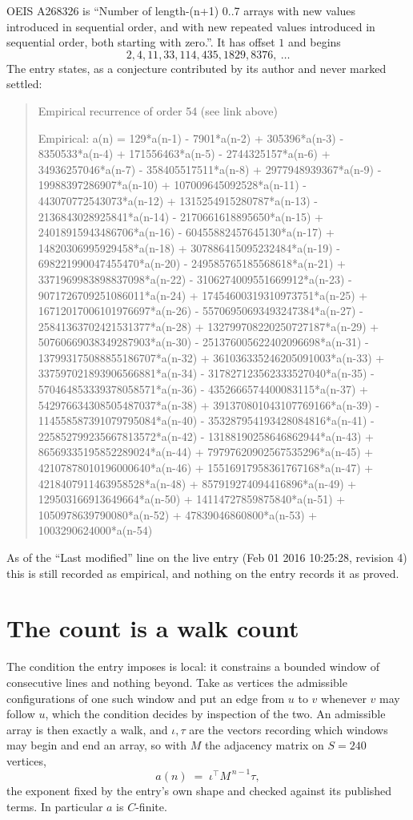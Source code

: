 \documentclass[11pt,a4paper]{article}
\theoremstyle{plain}
\theoremstyle{definition}
\begin{document}
OEIS A268326 is ``Number of length-(n+1) 0..7 arrays with new values introduced in sequential order, and with new repeated values introduced in sequential order, both starting with zero.''. It has offset $1$ and begins
\[
2, 4, 11, 33, 114, 435, 1829, 8376,\ \dots
\]
The entry states, as a conjecture contributed by its author and never marked settled:
\begin{quote}\raggedright\small
Empirical recurrence of order 54 (see link above)

Empirical: a(n) = 129*a(n-1) - 7901*a(n-2) + 305396*a(n-3) - 8350533*a(n-4) + 171556463*a(n-5) - 2744325157*a(n-6) + 34936257046*a(n-7) - 358405517511*a(n-8) + 2977948939367*a(n-9) - 19988397286907*a(n-10) + 107009645092528*a(n-11) - 443070772543073*a(n-12) + 1315254915280787*a(n-13) - 2136843028925841*a(n-14) - 2170661618895650*a(n-15) + 24018915943486706*a(n-16) - 60455882457645130*a(n-17) + 14820306995929458*a(n-18) + 307886415095232484*a(n-19) - 698221990047455470*a(n-20) - 249585765185568618*a(n-21) + 3371969983898837098*a(n-22) - 3106274009551669912*a(n-23) - 9071726709251086011*a(n-24) + 17454600319310973751*a(n-25) + 16712017006101976697*a(n-26) - 55706950693493247384*a(n-27) - 25841363702421531377*a(n-28) + 132799708220250727187*a(n-29) + 50760669038349287903*a(n-30) - 251376005622402096698*a(n-31) - 137993175088855186707*a(n-32) + 361036335246205091003*a(n-33) + 337597021893906566881*a(n-34) - 317827123562333527040*a(n-35) - 570464853339378058571*a(n-36) - 4352666574400083115*a(n-37) + 542976634308505487037*a(n-38) + 391370801043107769166*a(n-39) - 114558587391079795084*a(n-40) - 353287954193428084816*a(n-41) - 225852799235667813572*a(n-42) - 13188190258646862944*a(n-43) + 86569335195852289024*a(n-44) + 79797620902567535296*a(n-45) + 42107878010196000640*a(n-46) + 15516917958361767168*a(n-47) + 4218407911463958528*a(n-48) + 857919274094416896*a(n-49) + 129503166913649664*a(n-50) + 14114727859875840*a(n-51) + 1050978639790080*a(n-52) + 47839046860800*a(n-53) + 1003290624000*a(n-54)
\end{quote}
As of the ``Last modified'' line on the live entry (Feb 01 2016 10:25:28, revision 4) this is still
recorded as empirical, and nothing on the entry records it as proved.

\section{The count is a walk count}

The condition the entry imposes is local: it constrains a bounded window of consecutive lines and nothing beyond. Take as vertices the admissible configurations of one such window and put an edge from $u$ to $v$ whenever $v$ may follow $u$, which the condition decides by inspection of the two.
An admissible array is then exactly a walk, and $\iota,\tau$ are the vectors recording which windows may begin and end an array, so with $M$ the adjacency matrix on $S=240$ vertices,
\[
a(n)\;=\;\iota^{\!\top}M^{\,n-1}\tau ,
\]
the exponent fixed by the entry's own shape and checked against its published terms. In
particular $a$ is $C$-finite.
\end{document}
